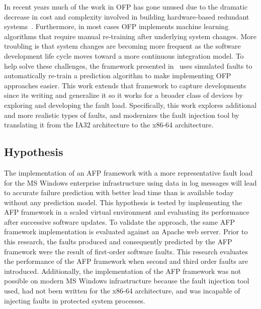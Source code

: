 In recent years much of the work in \ac{OFP} has gone unused due to the
dramatic decrease in cost and complexity involved in building hardware-based
redundant systems~\cite{irrera2015}.  Furthermore, in most cases \ac{OFP}
implements machine learning algorithms that require manual re-training after
underlying system changes.  More troubling is that system changes are becoming
more frequent as the software development life cycle moves toward a more
continuous integration model.  To help solve these challenges, the framework
presented in~\cite{irrera2015} uses simulated faults to automatically re-train
a prediction algorithm to make implementing \ac{OFP} approaches easier.  This
work extends that framework to capture developments since its writing and
generalize it so it works for a broader class of devices by exploring and
developing the fault load.  Specifically, this work explores additional and
more realistic types of faults, and modernizes the fault injection tool by
translating it from the IA32 architecture to the x86-64 architecture.

\subsection{Hypothesis}
The implementation of an \ac{AFP} framework with a more representative fault
load for the \ac{MS} Windows enterprise infrastructure using data in log
messages will lead to accurate failure prediction with better lead time than is
available today without any prediction model.  This hypothesis is tested by
implementing the \ac{AFP} framework in a scaled virtual environment and
evaluating its performance after successive software updates.  To validate the
approach, the same \ac{AFP} framework implementation is evaluated against an
Apache web server.  Prior to this research, the faults produced and
consequently predicted by the \ac{AFP} framework were the result of first-order
software faults.  This research evaluates the performance of the \ac{AFP}
framework when second and third order faults are introduced.  Additionally, the
implementation of the \ac{AFP} framework was not possible on modern \ac{MS}
Windows infrastructure because the fault injection tool used, had not been
written for the x86-64 architecture, and was incapable of injecting faults in
protected system processes.

